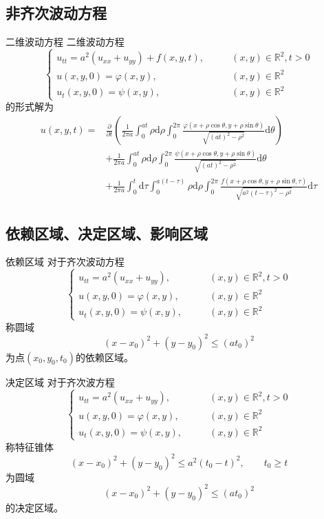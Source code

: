 \documentclass[lang = cn, scheme = chinese, thmcnt = section]{elegantbook}
\newcommand{\R}{\mathbb{R}}            %
\newcommand{\dd}{\mathrm{d}}           %
\begin{document}
\subsection{非齐次波动方程}

\begin{theorem}{二维波动方程}
	二维波动方程
	$$
	\begin{cases}
		u_{tt}=a^2(u_{xx}+u_{yy})+f(x,y,t),\qquad & (x,y)\in \R^2,t>0\\
		u(x,y,0)=\varphi(x,y),\qquad & (x,y)\in \R^2\\
		u_t(x,y,0)=\psi(x,y),\qquad & (x,y)\in \R^2
	\end{cases}
	$$
	的形式解为
	\begin{align*}
		u(x,y,t)
		= & \frac{\partial}{\partial t}\left(\frac{1}{2\pi a}\int_{0}^{at}\rho\dd\rho\int_{0}^{2\pi}\frac{\varphi(x+\rho\cos\theta,y+\rho\sin\theta)}{\sqrt{(at)^2-\rho^2}}\dd\theta\right)\\
		& + \frac{1}{2\pi a}\int_{0}^{at}\rho\dd\rho\int_{0}^{2\pi}\frac{\psi(x+\rho\cos\theta,y+\rho\sin\theta)}{\sqrt{(at)^2-\rho^2}}\dd\theta\\
		& + \frac{1}{2\pi a}\int_{0}^{t}\dd\tau\int_{0}^{a(t-\tau)}\rho\dd\rho\int_{0}^{2\pi}\frac{f(x+\rho\cos\theta,y+\rho\sin\theta,\tau)}{\sqrt{a^2(t-\tau)^2-\rho^2}}\dd\tau
	\end{align*}
\end{theorem}

\subsection{依赖区域、决定区域、影响区域}

\begin{definition}{依赖区域}
	对于齐次波动方程
	$$
	\begin{cases}
		u_{tt}=a^2(u_{xx}+u_{yy}),\qquad & (x,y)\in \R^2,t>0\\
		u(x,y,0)=\varphi(x,y),\qquad & (x,y)\in \R^2\\
		u_t(x,y,0)=\psi(x,y),\qquad & (x,y)\in \R^2
	\end{cases}
	$$
	称圆域%
	$$
	(x-x_0)^2+(y-y_0)^2\le (at_0)^2
	$$
	为点$(x_0,y_0,t_0)$的依赖区域。
\end{definition}

\begin{definition}{决定区域}
	对于齐次波方程
	$$
	\begin{cases}
		u_{tt}=a^2(u_{xx}+u_{yy}),\qquad & (x,y)\in \R^2,t>0\\
		u(x,y,0)=\varphi(x,y),\qquad & (x,y)\in \R^2\\
		u_t(x,y,0)=\psi(x,y),\qquad & (x,y)\in \R^2
	\end{cases}
	$$
	称特征锥体
	$$
	(x-x_0)^2+(y-y_0)^2\le a^2(t_0-t)^2,\qquad t_0\ge t
	$$
	为圆域
	$$
	(x-x_0)^2+(y-y_0)^2\le (at_0)^2
	$$
	的决定区域。
\end{definition}
\end{document}
